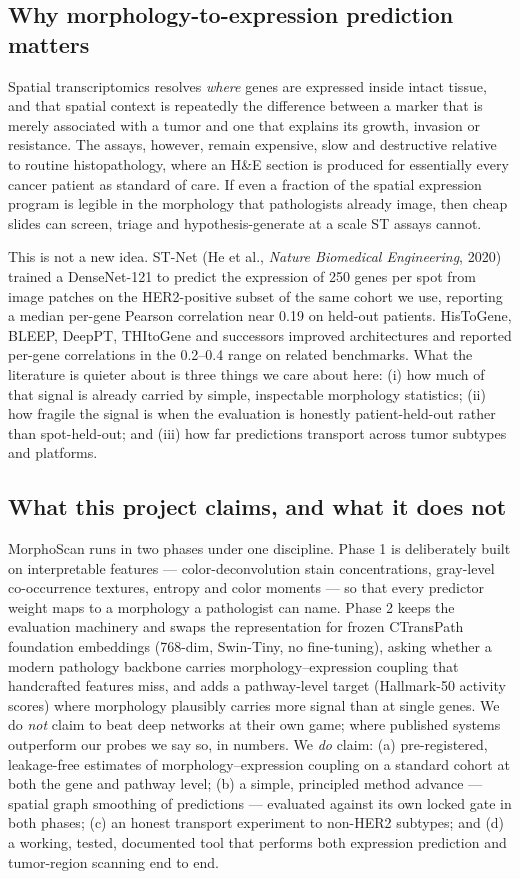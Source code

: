 \documentclass[11pt]{article}
\begin{document}
\subsection{Why morphology-to-expression prediction matters}
Spatial transcriptomics resolves \emph{where} genes are expressed inside intact tissue,
and that spatial context is repeatedly the difference between a marker that is merely
associated with a tumor and one that explains its growth, invasion or resistance. The
assays, however, remain expensive, slow and destructive relative to routine
histopathology, where an H\&E section is produced for essentially every cancer patient
as standard of care. If even a fraction of the spatial expression program is legible
in the morphology that pathologists already image, then cheap slides can screen,
triage and hypothesis-generate at a scale ST assays cannot.

This is not a new idea. ST-Net (He et al., \emph{Nature Biomedical Engineering}, 2020)
trained a DenseNet-121 to predict the expression of 250 genes per spot from image
patches on the HER2-positive subset of the same cohort we use, reporting a median
per-gene Pearson correlation near 0.19 on held-out patients. HisToGene, BLEEP,
DeepPT, THItoGene and successors improved architectures and reported per-gene
correlations in the 0.2--0.4 range on related benchmarks. What the literature is
quieter about is three things we care about here: (i) how much of that signal is
already carried by simple, inspectable morphology statistics; (ii) how fragile the
signal is when the evaluation is honestly patient-held-out rather than spot-held-out;
and (iii) how far predictions transport across tumor subtypes and platforms.

\subsection{What this project claims, and what it does not}
MorphoScan runs in two phases under one discipline. Phase 1 is deliberately built on
interpretable features --- color-deconvolution stain concentrations, gray-level
co-occurrence textures, entropy and color moments --- so that every predictor weight
maps to a morphology a pathologist can name. Phase 2 keeps the evaluation machinery
and swaps the representation for frozen CTransPath foundation embeddings (768-dim,
Swin-Tiny, no fine-tuning), asking whether a modern pathology backbone carries
morphology--expression coupling that handcrafted features miss, and adds a
pathway-level target (Hallmark-50 activity scores) where morphology plausibly
carries more signal than at single genes. We do
\emph{not} claim to beat deep networks at their own game; where published systems
outperform our probes we say so, in numbers. We \emph{do} claim: (a) pre-registered,
leakage-free estimates of morphology--expression coupling on a standard cohort at
both the gene and pathway level; (b) a simple, principled method advance --- spatial
graph smoothing of predictions --- evaluated against its own locked gate in both
phases; (c) an honest transport experiment to non-HER2 subtypes; and
(d) a working, tested, documented tool that performs both expression prediction and
tumor-region scanning end to end.
\end{document}
